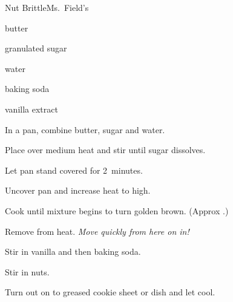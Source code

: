 \begin{recipe}{Nut Brittle}{Ms.~Field's}{}

\begin{ingredients}
\item \C{1 \half} 
\item {} butter
\item {} granulated sugar
\item \C{\quarter} water
\item \tp{\quarter} baking soda
\item {} vanilla extract
\end{ingredients}

\begin{directions}
\item In a pan, combine butter, sugar and water.
\item Place over medium heat and stir until sugar dissolves.
\item Let pan stand covered for 2~minutes.
\item Uncover pan and increase heat to high.
\item Cook until mixture begins to turn golden brown. (Approx .)
\item Remove from heat. \emph{ Move quickly from here on in! }
\item Stir in vanilla and then baking soda.
\item Stir in nuts.
\item Turn out on to greased cookie sheet or dish and let cool. 
\end{directions}

\end{recipe}
